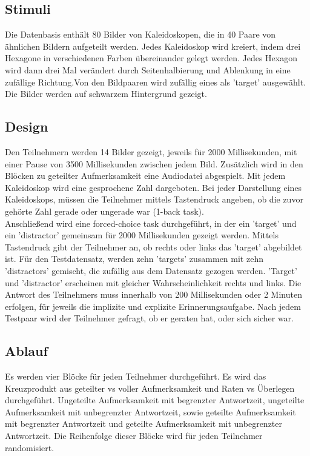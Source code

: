 \documentclass{article}
\begin{document}
\subsection{Stimuli}
Die Datenbasis enthält 80 Bilder von Kaleidoskopen, die in 40 Paare von ähnlichen Bildern aufgeteilt werden. Jedes Kaleidoskop wird kreiert, indem drei Hexagone in verschiedenen Farben übereinander gelegt werden. Jedes Hexagon wird dann drei Mal verändert durch Seitenhalbierung und Ablenkung in eine zufällige Richtung.Von den Bildpaaren wird zufällig eines als 'target' ausgewählt. Die Bilder werden auf schwarzem Hintergrund gezeigt.
\subsection{Design}
Den Teilnehmern werden 14 Bilder gezeigt, jeweils für 2000 Millisekunden, mit einer Pause von 3500 Millisekunden zwischen jedem Bild. Zusätzlich wird in den Blöcken zu geteilter Aufmerksamkeit eine Audiodatei abgespielt. Mit jedem Kaleidoskop wird eine gesprochene Zahl dargeboten. Bei jeder Darstellung eines Kaleidoskops, müssen die Teilnehmer mittels Tastendruck angeben, ob die zuvor gehörte Zahl gerade oder ungerade war (1-back task).\\
Anschließend wird eine forced-choice task durchgeführt, in der ein 'target' und ein 'distractor' gemeinsam für 2000 Millisekunden gezeigt werden. Mittels Tastendruck gibt der Teilnehmer an, ob rechts oder links das 'target' abgebildet ist. Für den Testdatensatz, werden zehn 'targets' zusammen mit zehn 'distractors' gemischt, die zufällig aus dem Datensatz gezogen werden. 'Target' und 'distractor' erscheinen mit gleicher Wahrscheinlichkeit rechts und links. Die Antwort des Teilnehmers muss innerhalb von 200 Millisekunden oder 2 Minuten erfolgen, für jeweils die implizite und explizite Erinnerungsaufgabe. Nach jedem Testpaar wird der Teilnehmer gefragt, ob er geraten hat, oder sich sicher war.
\subsection{Ablauf}
Es werden vier Blöcke für jeden Teilnehmer durchgeführt. Es wird das Kreuzprodukt aus geteilter vs voller Aufmerksamkeit und Raten vs Überlegen durchgeführt. Ungeteilte Aufmerksamkeit mit begrenzter Antwortzeit, ungeteilte Aufmerksamkeit mit unbegrenzter Antwortzeit, sowie geteilte Aufmerksamkeit mit begrenzter Antwortzeit und geteilte Aufmerksamkeit mit unbegrenzter Antwortzeit. Die Reihenfolge dieser Blöcke wird für jeden Teilnehmer randomisiert.


\end{document}
